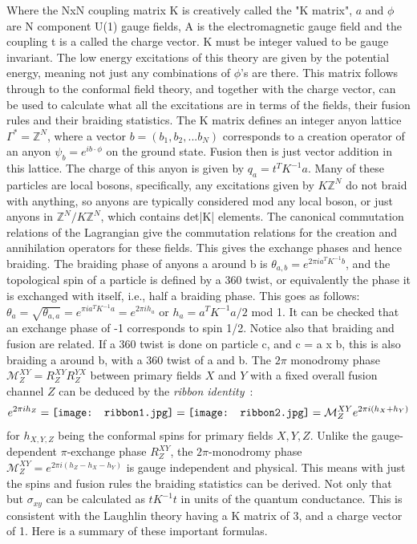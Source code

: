 Where the NxN coupling matrix K is creatively called the "K matrix", $a$ and $\phi$ are N component U(1) gauge fields, A is the electromagnetic gauge field and the coupling t is a called the charge vector. K must be integer valued to be gauge invariant. The low energy excitations of this theory are given by the potential energy, meaning not just any combinations of $\phi$'s are there. This matrix follows through to the conformal field theory, and together with the charge vector, can be used to calculate what all the excitations are in terms of the fields, their fusion rules and their braiding statistics. The K matrix defines an integer anyon lattice $\Gamma^*=\mathbb{Z}^N$, where a vector $b=(b_1,b_2,...b_N)$ corresponds to a creation operator of an anyon $\psi_b=e^{i b \cdot \phi}$ on the ground state. Fusion then is just vector addition in this lattice. The charge of this anyon is given by $q_a = t^TK^{-1}a$. Many of these particles are local bosons, specifically, any excitations given by $K\mathbb{Z}^N$ do not braid with anything, so anyons are typically considered mod any local boson, or just anyons in $\mathbb{Z}^N/K\mathbb{Z}^N$, which contains det|K| elements. The canonical commutation relations of the Lagrangian give the commutation relations for the creation and annihilation operators for these fields. This gives the exchange phases and hence braiding. The braiding phase of anyons a around b is $\theta_{a,b} = e^{2\pi i a^T K^{-1} b}$, and the topological spin of a particle is defined by a 360 twist, or equivalently the phase it is exchanged with itself, i.e., half a braiding phase. This goes as follows: $\theta_a=\sqrt{\theta_{a,a}} = e^{\pi i a^T K^{-1} a} = e^{2 \pi i h_a}$ or $h_a = a^T K^{-1} a /2$ mod 1. It can be checked that an exchange phase of -1 corresponds to spin 1/2. Notice also that braiding and fusion are related. If a 360 twist is done on particle c, and c = a x b, this is also braiding a around b, with a 360 twist of a and b. The $2\pi$ monodromy phase $\mathcal{M}^{XY}_Z=R^{XY}_ZR^{YX}_Z$ between primary fields $X$ and $Y$ with a fixed overall fusion channel $Z$ can be deduced by the {\em ribbon identity}~\cite{Kitaev06}: \begin{align}e^{2\pi ih_Z}=\vcenter{\hbox{\texttt{[image: ribbon1.jpg]}}}=\vcenter{\hbox{\texttt{[image: ribbon2.jpg]}}}=\mathcal{M}^{XY}_Ze^{2\pi i(h_X+h_Y)}\label{ribbonapp}\end{align} for $h_{X,Y,Z}$ being the conformal spins for primary fields $X,Y,Z$. Unlike the gauge-dependent $\pi$-exchange phase $R^{XY}_Z$, the $2\pi$-monodromy phase $\mathcal{M}^{XY}_Z=e^{2\pi i(h_Z-h_X-h_Y)}$ is gauge independent and physical. This means with just the spins and fusion rules the braiding statistics can be derived. Not only that but $\sigma_{xy}$ can be calculated as $tK^{-1}t$  in units of the quantum conductance. This is consistent with the Laughlin theory having a K matrix of 3, and a charge vector of 1. Here is a summary of these important formulas.

